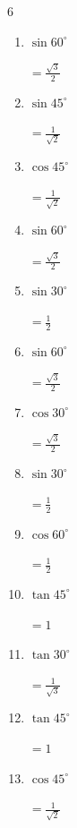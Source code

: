 \begin{multicols}{6}
\begin{enumerate}
  \item $\displaystyle \sin{60^\circ}$

        $\displaystyle =\frac{\sqrt{3}}{2}$

  \item $\displaystyle \sin{45^\circ}$

        $\displaystyle =\frac{1}{\sqrt{2}}$

  \item $\displaystyle \cos{45^\circ}$

        $\displaystyle =\frac{1}{\sqrt{2}}$

  \item $\displaystyle \sin{60^\circ}$

        $\displaystyle =\frac{\sqrt{3}}{2}$

  \item $\displaystyle \sin{30^\circ}$

        $\displaystyle =\frac{1}{2}$

\columnbreak %

  \item $\displaystyle \sin{60^\circ}$

        $\displaystyle =\frac{\sqrt{3}}{2}$

  \item $\displaystyle \cos{30^\circ}$

        $\displaystyle =\frac{\sqrt{3}}{2}$

  \item $\displaystyle \sin{30^\circ}$

        $\displaystyle =\frac{1}{2}$

  \item $\displaystyle \cos{60^\circ}$

        $\displaystyle =\frac{1}{2}$

  \item $\displaystyle \tan{45^\circ}$

        $\displaystyle =1$

  \item $\displaystyle \tan{30^\circ}$

        $\displaystyle =\frac{1}{\sqrt{3}}$

  \item $\displaystyle \tan{45^\circ}$

        $\displaystyle =1$

  \item $\displaystyle \cos{45^\circ}$

        $\displaystyle =\frac{1}{\sqrt{2}}$


\end{enumerate}
\end{multicols}
